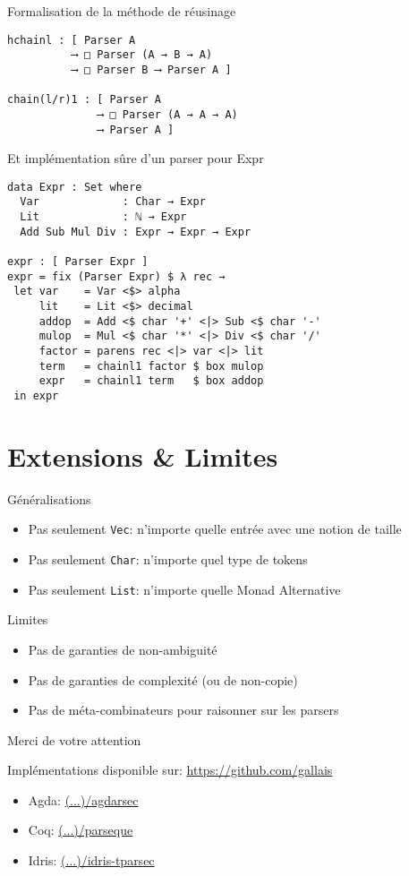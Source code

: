 \documentclass{beamer}
\begin{document}
\begin{frame}[fragile]{Formalisation de la méthode de réusinage}
\begin{verbatim}
hchainl : [ Parser A
          ⟶ □ Parser (A → B → A)
          ⟶ □ Parser B ⟶ Parser A ]

chain(l/r)1 : [ Parser A
              ⟶ □ Parser (A → A → A)
              ⟶ Parser A ]
\end{verbatim}
\end{frame}

\begin{frame}[fragile]{Et implémentation sûre d'un parser pour Expr}
\begin{verbatim}
data Expr : Set where
  Var             : Char → Expr
  Lit             : ℕ → Expr
  Add Sub Mul Div : Expr → Expr → Expr

expr : [ Parser Expr ]
expr = fix (Parser Expr) $ λ rec →
 let var    = Var <$> alpha
     lit    = Lit <$> decimal
     addop  = Add <$ char '+' <|> Sub <$ char '-'
     mulop  = Mul <$ char '*' <|> Div <$ char '/'
     factor = parens rec <|> var <|> lit
     term   = chainl1 factor $ box mulop
     expr   = chainl1 term   $ box addop
 in expr
\end{verbatim}
\end{frame}

\section{Extensions \& Limites}

\begin{frame}{Généralisations}
\begin{itemize}
  \item Pas seulement \texttt{Vec}: n'importe quelle entrée avec une notion de taille
  \item Pas seulement \texttt{Char}: n'importe quel type de tokens
  \item Pas seulement \texttt{List}: n'importe quelle Monad Alternative
\end{itemize}
\end{frame}

\begin{frame}{Limites}
\begin{itemize}
  \item Pas de garanties de non-ambiguité
  \item Pas de garanties de complexité (ou de non-copie)
  \item Pas de méta-combinateurs pour raisonner sur les parsers
\end{itemize}
\end{frame}

\begin{frame}[fragile]{Merci de votre attention}

Implémentations disponible sur: \url{https://github.com/gallais}
\begin{itemize}
  \item Agda: \url{(...)/agdarsec}
  \item Coq: \url{(...)/parseque}
  \item Idris: \url{(...)/idris-tparsec}
\end{itemize}
\end{frame}
\end{document}
